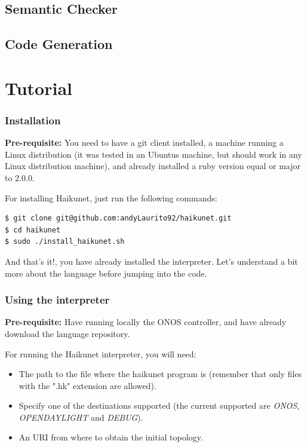 \subsection{Semantic Checker}

\subsection{Code Generation}

\section{Tutorial}

\subsubsection{Installation}

\textbf{Pre-requisite:} You need to have a git client installed, a machine running a Linux distribution (it was tested in an Ubuntus machine, but should work in any Linux distribution machine), and already installed a ruby version equal or major to 2.0.0.

For installing Haikunet, just run the following commands:

\begin{lstlisting}[language=bash,breaklines=true]
$ git clone git@github.com:andyLaurito92/haikunet.git
$ cd haikunet
$ sudo ./install_haikunet.sh 
\end{lstlisting}

And that's it!, you have already installed the interpreter. Let's understand a bit more about the language before jumping into the code.

\subsubsection{Using the interpreter}

\textbf{Pre-requisite:} Have running locally the ONOS controller, and have already download the language repository.

For running the Haikunet interpreter, you will need: 
\begin{itemize}
\item The path to the file where the haikunet program is (remember that only files with the ".hk" extension are allowed).
\item Specify one of the destinations supported (the current supported are \textit{ONOS}, \textit{OPENDAYLIGHT} and \textit{DEBUG}).
\item An URI from where to obtain the initial topology.
\end{itemize}

